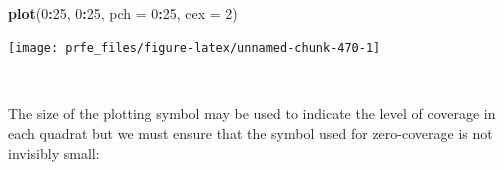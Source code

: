 \documentclass[12pt,a4paper]{book}
\newenvironment{Shaded}{\begin{snugshade}}{\end{snugshade}}
\newcommand{\KeywordTok}[1]{\textcolor[rgb]{0.13,0.29,0.53}{\textbf{#1}}}
\newcommand{\DataTypeTok}[1]{\textcolor[rgb]{0.13,0.29,0.53}{#1}}
\newcommand{\DecValTok}[1]{\textcolor[rgb]{0.00,0.00,0.81}{#1}}
\newcommand{\StringTok}[1]{\textcolor[rgb]{0.31,0.60,0.02}{#1}}
\newcommand{\OperatorTok}[1]{\textcolor[rgb]{0.81,0.36,0.00}{\textbf{#1}}}
\newcommand{\NormalTok}[1]{#1}
\theoremstyle{definition}
\theoremstyle{definition}
\theoremstyle{definition}
\theoremstyle{remark}
\begin{document}
~

\begin{Shaded}
\begin{Highlighting}[]
\KeywordTok{plot}\NormalTok{(}\DecValTok{0}\OperatorTok{:}\DecValTok{25}\NormalTok{, }\DecValTok{0}\OperatorTok{:}\DecValTok{25}\NormalTok{, }\DataTypeTok{pch =} \DecValTok{0}\OperatorTok{:}\DecValTok{25}\NormalTok{, }\DataTypeTok{cex =} \DecValTok{2}\NormalTok{)}
\end{Highlighting}
\end{Shaded}

\begin{center}\texttt{[image: prfe\_files/figure-latex/unnamed-chunk-470-1]} \end{center}

~

The size of the plotting symbol may be used to indicate the level of
coverage in each quadrat but we must ensure that the symbol used for
zero-coverage is not invisibly small:

~

\begin{Shaded}
\end{Shaded}
\end{document}
